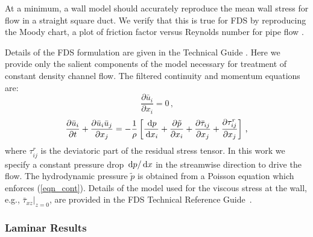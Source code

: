 \documentclass[11pt]{book}
\begin{document}
At a minimum, a wall model should accurately reproduce the mean wall stress for flow in a straight square duct.  We verify that this is true for FDS by reproducing the Moody chart, a plot of friction factor versus Reynolds number for pipe flow \cite{Moody:1944}.

Details of the FDS formulation are given in the Technical Guide \cite{FDS_Math_Guide}.  Here we provide only the salient components of the model necessary for treatment of constant density channel flow. The filtered continuity and momentum equations are:
\begin{equation}
\label{eqn_cont}
\frac{\partial \bar{u}_i}{\partial x_i} = 0 \,\mbox{,}
\end{equation}
\begin{equation}
\label{eqn_mom1}
\frac{\partial \bar{u}_i}{\partial t} + \frac{\partial \bar{u}_i \bar{u}_j}{\partial x_j} = -\frac{1}{\rho} \left[ \frac{\,\mathrm{d} p}{\,\mathrm{d} x_i} + \frac{\partial \tilde{p}}{\partial x_i} + \frac{\partial \bar{\tau}_{ij}}{\partial x_j} + \frac{\partial \tau_{ij}^{r}}{\partial x_j} \right]\,\mbox{,}
\end{equation}
where $\tau_{ij}^{r}$ is the deviatoric part of the residual stress tensor.  In this work we specify a constant pressure drop $\,\mathrm{d} p/\,\mathrm{d} x$ in the streamwise direction to drive the flow.  The hydrodynamic pressure $\tilde{p}$ is obtained from a Poisson equation which enforces (\ref{eqn_cont}). Details of the model used for the viscous stress at the wall, e.g., $\bar{\tau}_{xz}|_{z=0}$, are provided in the FDS Technical Reference Guide~\cite{FDS_Tech_Guide}.

\subsubsection{Laminar Results}
\label{laminar}
\end{document}
